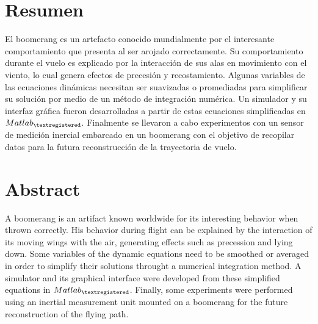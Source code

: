 \section*{Resumen} 

	El boomerang es un artefacto conocido mundialmente por el interesante comportamiento que presenta al ser arojado correctamente. Su comportamiento durante el vuelo es explicado por la interacción de sus alas en movimiento con el viento, lo cual genera efectos de precesión y recostamiento. Algunas variables de las ecuaciones dinámicas necesitan ser suavizadas o promediadas para simplificar su solución por medio de un método de integración numérica. Un simulador y su interfaz gráfica fueron desarrolladas a partir de estas ecuaciones simplificadas en $Matlab_{\textregistered}$. Finalmente se llevaron a cabo experimentos con un sensor de medición inercial embarcado en un boomerang con el objetivo de recopilar datos para la futura reconstrucción de la trayectoria de vuelo.

\begingroup
\let\clearpage\relax

\section*{Abstract}


	A boomerang is an artifact known worldwide for its interesting behavior when thrown correctly. His behavior during flight can be explained by the interaction of its moving wings with the air, generating effects such as precession and lying down. Some variables of the dynamic equations need to be smoothed or averaged in order to simplify their solutions throught a numerical integration method. A simulator and its graphical interface were developed from these simplified equations in $Matlab_{\textregistered}$. Finally, some experiments were performed using an inertial measurement unit mounted on a boomerang for the future reconstruction of the flying path.

\endgroup
